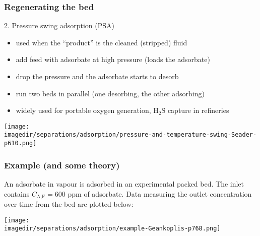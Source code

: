 \begin{frame}\frametitle{Regenerating the bed}
	2.	Pressure swing adsorption (PSA)
	\begin{itemize}
		\item	used when the ``product'' is the cleaned (stripped) fluid
		\item	add feed with adsorbate at high pressure (loads the adsorbate)
		\item	drop the pressure and the adsorbate starts to desorb
		\item	run two beds in parallel (one desorbing, the other adsorbing)
		\item	widely used for portable oxygen generation, $\text{H}_2\text{S}$ capture in refineries		
	\end{itemize}
	\begin{center}
		\texttt{[image: \\imagedir/separations/adsorption/pressure-and-temperature-swing-Seader-p610.png]}
	\end{center}
	\vspace{-12pt}
\end{frame}

\begin{frame}\frametitle{Example (and some theory)}
	An adsorbate in vapour is adsorbed in an experimental packed bed. The inlet contains $C_\text{A,F} = 600$ ppm of adsorbate. Data measuring the outlet concentration over time from the bed are plotted below:
	
	\begin{center}
		\texttt{[image: \\imagedir/separations/adsorption/example-Geankoplis-p768.png]}
	\end{center}
	\vspace{-24pt}
\end{frame}

